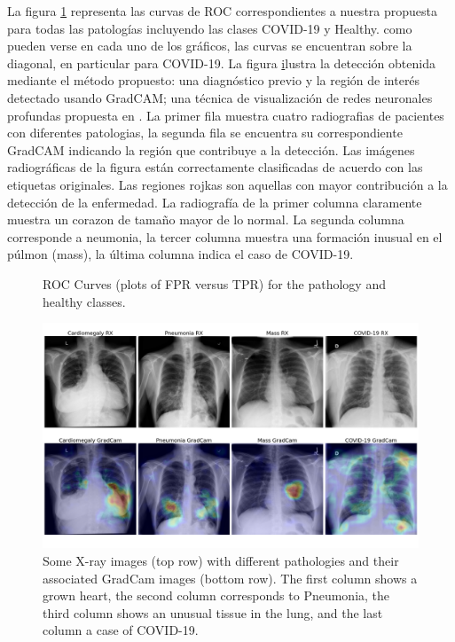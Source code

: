 La figura \ref{roc-curves} representa las curvas de ROC correspondientes a nuestra propuesta para
todas las patologías incluyendo las clases COVID-19 y Healthy. como pueden verse en cada uno de los
gráficos, las curvas se encuentran sobre la diagonal, en particular para COVID-19. La figura
\href{img-results} ilustra la detección obtenida mediante el método propuesto: una diagnóstico previo
y la región de interés detectado usando GradCAM; una técnica de visualización de redes neuronales
profundas propuesta en \cite{selvaraju2017grad}. La primer fila muestra cuatro radiografias de
pacientes con diferentes patologias, la segunda fila se encuentra su correspondiente GradCAM
indicando la región que contribuye a la detección. Las imágenes radiográficas de la figura están
correctamente clasificadas de acuerdo con las etiquetas originales. Las regiones rojkas son aquellas
con mayor contribución a la detección de la enfermedad. La radiografía de la primer columna claramente
muestra un corazon de tamaño mayor de lo normal. La segunda columna corresponde a neumonia, la
tercer columna muestra una formación inusual en el púlmon (mass), la última columna indica el caso
de COVID-19.



\begin{figure}
    \begin{center}
        \scalebox{0.6}{}
    \end{center}
    \caption{ROC Curves (plots of FPR versus TPR) for the pathology and healthy classes.}
    \label{roc-curves}
\end{figure}

\begin{figure}[ht!]
    \centering
    \includegraphics[width=0.8 \textwidth]{Chapters/4. ViT-Lung/images/vlgrid.png}
    \caption{Some X-ray images (top row) with different pathologies and their associated GradCam images
         (bottom row). The first column shows a grown heart, the second column corresponds to
         Pneumonia, the third column shows an unusual tissue in the lung, and the last column a case
         of COVID-19.}
    \label{img-results}
\end{figure}
